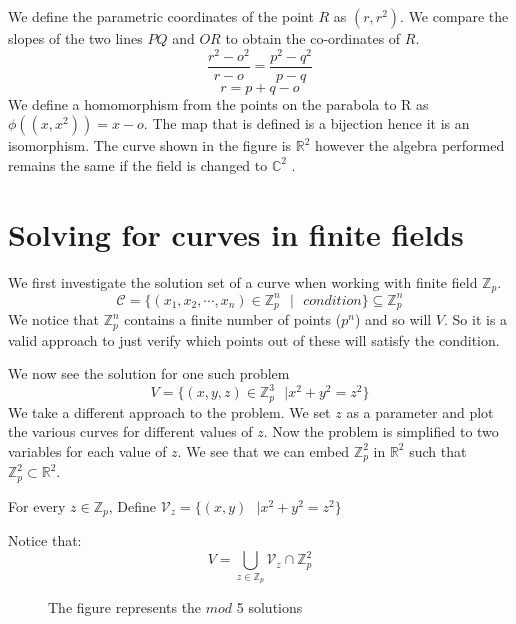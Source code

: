 \documentclass{report}
\begin{document}
We define the parametric coordinates of the point $R$ as $(r,r^2)$.
We compare the slopes of the two lines $PQ$ and $OR$ to obtain the co-ordinates of $R$.
\[\frac{r^2-o^2}{r-o} = \frac{p^2-q^2}{p-q}\]
\[r = p+q-o\]
We define a homomorphism from the points on the parabola to R as $\phi((x,x^2)) = x-o$.
The map that is defined is a bijection hence it is an isomorphism.
The curve shown in the figure is $\mathbb{R}^2$ however the algebra performed remains the same if the field is changed to $\mathbb{C}^2$ .

\section*{Solving for curves in finite fields}

We first investigate the solution set of a curve when working with finite field $\mathbb{Z}_p$.
\[\mathcal{C}  = \{(x_1,x_2,\cdots,x_n) \in \mathbb{Z}_p^n \text{ }|\text{ } condition \} \subseteq \mathbb{Z}_p^n\]
We notice that $\mathbb{Z}_p^n$ contains a finite number of points ($p^n$) and so will $V$.
So it is a valid approach to just verify which points out of these will satisfy the condition.
\vspace{1ex}

\noindent We now see the solution for one such problem
\[V = \{(x,y,z) \in \mathbb{Z}_p^3 \text{ }| x^2+y^2 = z^2\}\]
We take a different approach to the problem.
We set $z$ as a parameter and plot the various curves for different values of $z$.
Now the problem is simplified to two variables for each value of $z$.
We see that we can embed $\mathbb{Z}_p^2 \text{ in } \mathbb{R}^2$ such that $\mathbb{Z}_p^2 \subset \mathbb{R}^2$.

For every $z \in \mathbb{Z}_p$, 
Define $\mathcal{V}_z = \{(x,y) \text{ }| x^2+y^2=z^2\}$

Notice that: 
\[V = \bigcup_{z \in \mathbb{Z}_p}\mathcal{V}_z\cap\mathbb{Z}_p^2 \]
\begin{figure}[H]
    \centering
    \caption{The figure represents the $mod$ 5 solutions}
\end{figure}
\end{document}
